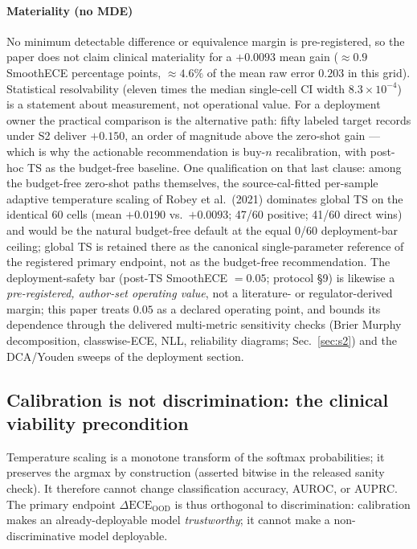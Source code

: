 \documentclass[final,5p,times,nonatbib]{elsarticle}
\begin{document}
\paragraph{Materiality (no MDE)} No minimum detectable difference or
equivalence margin is pre-registered, so the paper does not claim
clinical materiality for a $+0.0093$ mean gain ($\approx 0.9$
SmoothECE percentage points, $\approx 4.6\%$ of the mean raw error
$0.203$ in this grid). Statistical resolvability (eleven times the
median single-cell CI width $8.3\times10^{-4}$) is a statement about
measurement, not operational value. For a deployment owner the
practical comparison is the alternative path: fifty labeled target
records under S2 deliver $+0.150$, an order of magnitude above the
zero-shot gain --- which is why the actionable recommendation is
buy-$n$ recalibration, with post-hoc TS as the budget-free baseline.
One qualification on that last clause: among the budget-free
zero-shot paths themselves, the source-cal-fitted per-sample adaptive
temperature scaling of Robey et al.\ (2021) dominates global TS on the
identical 60 cells (mean $+0.0190$ vs.\ $+0.0093$; 47/60 positive;
41/60 direct wins) and would be the natural budget-free default at the
equal 0/60 deployment-bar ceiling; global TS is retained there as the
canonical single-parameter reference of the registered primary
endpoint, not as the budget-free recommendation.
    The deployment-safety bar (post-TS SmoothECE $=0.05$; protocol
    \S9) is likewise a \emph{pre-registered, author-set operating
    value}, not a literature- or regulator-derived margin; this paper
    treats $0.05$ as a declared operating point, and bounds its
    dependence through the delivered multi-metric sensitivity checks
    (Brier Murphy decomposition, classwise-ECE, NLL, reliability
    diagrams; Sec.~\ref{sec:s2}) and the DCA/Youden sweeps of the
    deployment section.

\subsection{Calibration is not discrimination: the clinical viability precondition}
Temperature scaling is a monotone transform of the softmax
probabilities; it preserves the argmax by construction (asserted
bitwise in the released sanity check). It therefore cannot change
classification accuracy, AUROC, or AUPRC. The primary endpoint
$\Delta\text{ECE}_{\text{OOD}}$ is thus orthogonal to discrimination:
calibration makes an already-deployable model \emph{trustworthy}; it
cannot make a non-discriminative model deployable.
\end{document}
